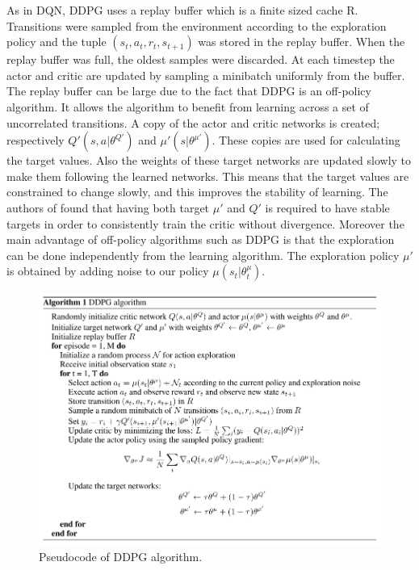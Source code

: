 \documentclass[a4paper]{report}
\begin{document}
As in DQN, DDPG uses a replay buffer which is a finite sized cache R. Transitions were sampled from the environment according to the exploration policy and the tuple $(s_{t}, a_{t}, r_{t}, s_{t+1})$ was stored in the replay buffer. When the replay buffer was full, the oldest samples were discarded. At each timestep the actor and critic are updated by sampling a minibatch uniformly from the buffer. The replay buffer can be large due to the fact that DDPG is an off-policy algorithm. It allows the algorithm to benefit from learning across a set of uncorrelated transitions. A copy of the actor and critic networks is created; respectively $Q'(s,a|\theta^{Q'})$ and $\mu'(s|\theta^{\mu'})$. These copies are used for calculating the target values. Also the weights of these target networks are updated slowly to make them following the learned networks. This means that the target values are constrained to change slowly, and this improves the stability of learning. The authors of \cite{ddpg} found that having both target $\mu'$ and $Q'$ is required to have stable targets in order to consistently train the critic without divergence. 
Moreover the main advantage of off-policy algorithms such as DDPG is that the exploration can be done independently from the learning algorithm. The exploration policy $\mu'$ is obtained by adding noise to our policy $\mu(s_{t}|\theta_{t}^{\mu})$.

\begin{figure}[h!]
\centering
\includegraphics[scale=0.65]{ddpg.png}
\caption{\label{Fig: ddpg} Pseudocode of DDPG algorithm.}
\end{figure}
\end{document}
